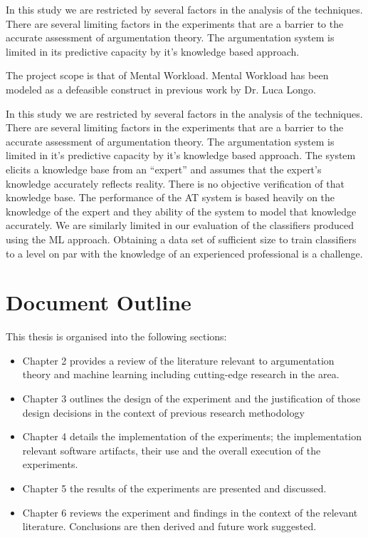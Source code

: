 In this study we are restricted by several factors in the analysis of the techniques. There are several limiting factors in the experiments that are a barrier to the accurate assessment of argumentation theory. The argumentation system is limited in its predictive capacity by it’s knowledge based approach.

The project scope is that of Mental Workload. Mental Workload has been modeled as a defeasible construct in previous work by Dr. Luca Longo. 


In this study we are restricted by several factors in the analysis of the techniques.
There are several limiting factors in the experiments that are a barrier to the accurate assessment of argumentation theory.
The argumentation system is limited in it's predictive capacity by it's knowledge based approach.
The system elicits a knowledge base from an ``expert'' and assumes that the expert's knowledge accurately reflects reality.
There is no objective verification of that knowledge base. The performance of the AT system is based heavily on the knowledge of the expert and they ability of the system to model that knowledge accurately.
We are similarly limited in our evaluation of the classifiers produced using the ML approach.
Obtaining a data set of sufficient size to train classifiers to a level on par with the knowledge of an experienced professional is a challenge.


\section{Document Outline}

This thesis is organised into the following sections:

\begin{itemize}

  \item Chapter 2 provides a review of the literature relevant to argumentation theory and machine learning including cutting-edge research in the area.
  \item Chapter 3 outlines the design of the experiment and the justification of those design decisions in the context of previous research methodology
  \item Chapter 4 details the implementation of the experiments; the implementation relevant software artifacts, their use and the overall execution of the experiments.
  \item Chapter 5 the results of the experiments are presented and discussed.
  \item Chapter 6 reviews the experiment and findings in the context of the relevant literature. Conclusions are then derived and future work suggested.

\end{itemize}

